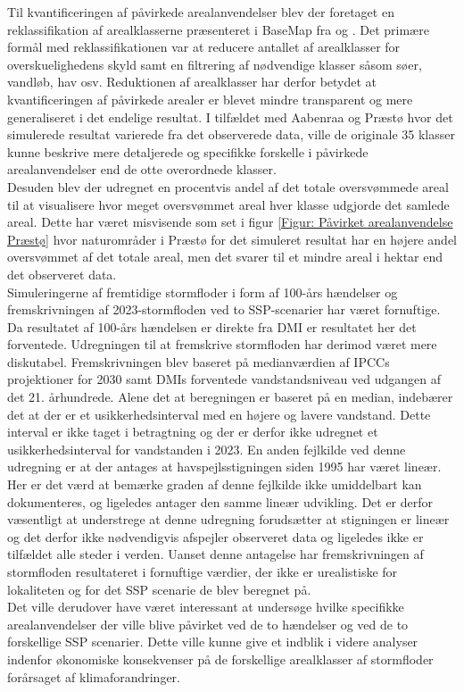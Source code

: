 Til kvantificeringen af påvirkede arealanvendelser blev der foretaget en reklassifikation af arealklasserne præsenteret i BaseMap fra \cite{Jepsen_levin_2013} og \cite{levin_basemap04_2022}. Det primære formål med reklassifikationen var at reducere antallet af arealklasser for overskuelighedens skyld samt en filtrering af nødvendige klasser såsom søer, vandløb, hav osv. Reduktionen af arealklasser har derfor betydet at kvantificeringen af påvirkede arealer er blevet mindre transparent og mere generaliseret i det endelige resultat. I tilfældet med Aabenraa og Præstø hvor det simulerede resultat varierede fra det observerede data, ville de originale 35 klasser kunne beskrive mere detaljerede og specifikke forskelle i påvirkede arealanvendelser end de otte overordnede klasser.\\
Desuden blev der udregnet en procentvis andel af det totale oversvømmede areal til at visualisere hvor meget oversvømmet areal hver klasse udgjorde det samlede areal. Dette har været misvisende som set i figur \ref{Figur: Påvirket arealanvendelse Præstø} hvor naturområder i Præstø for det simuleret resultat har en højere andel oversvømmet af det totale areal, men det svarer til et mindre areal i hektar end det observeret data.\\ 

Simuleringerne af fremtidige stormfloder i form af 100-års hændelser og fremskrivningen af 2023-stormfloden ved to SSP-scenarier har været fornuftige. Da resultatet af 100-års hændelsen er direkte fra DMI er resultatet her det forventede. Udregningen til at fremskrive stormfloden har derimod været mere diskutabel. Fremskrivningen blev baseret på medianværdien af IPCCs projektioner for 2030 samt DMIs forventede vandstandsniveau ved udgangen af det 21. århundrede. Alene det at beregningen er baseret på en median, indebærer det at der er et usikkerhedsinterval med en højere og lavere vandstand. Dette interval er ikke taget i betragtning og der er derfor ikke udregnet et usikkerhedsinterval for vandstanden i 2023. En anden fejlkilde ved denne udregning er at der antages at havspejlsstigningen siden 1995 har været lineær. Her er det værd at bemærke graden af denne fejlkilde ikke umiddelbart kan dokumenteres, og \cite{danish_meteorological_institute_dmi_2024} ligeledes antager den samme lineær udvikling. Det er derfor væsentligt at understrege at denne udregning forudsætter at stigningen er lineær og det derfor ikke nødvendigvis afspejler observeret data og ligeledes ikke er tilfældet alle steder i verden. Uanset denne antagelse har fremskrivningen af stormfloden resultateret i fornuftige værdier, der ikke er urealistiske for lokaliteten og for det SSP scenarie de blev beregnet på. \\
Det ville derudover have været interessant at undersøge hvilke specifikke arealanvendelser der ville blive påvirket ved de to hændelser og ved de to forskellige SSP scenarier. Dette ville kunne give et indblik i videre analyser indenfor økonomiske konsekvenser på de forskellige arealklasser af stormfloder forårsaget af klimaforandringer. 


